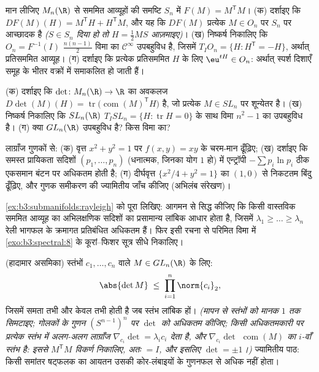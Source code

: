 \begin{exercise}[$\star\star$]\label{exo:b3:submanifolds:5}
मान लीजिए $M_n(\R)$ से सममित आव्यूहों की समष्टि $S_n$ में $F(M) = M^{\mathsf T}M$।
(क) दर्शाइए कि $DF(M)(H) = M^{\mathsf T}H + H^{\mathsf T}M$, और यह कि $DF(M)$ प्रत्येक $M \in O_n$ पर $S_n$ पर
आच्छादक है \emph{($S \in S_n$ दिया हो तो $H = \frac12MS$ आज़माइए)}।
(ख) निष्कर्ष निकालिए कि $O_n = F^{-1}(I)$ $\frac{n(n-1)}2$ विमा का  $\mathcal C^\infty$ उपबहुविध
है, जिसमें $T_IO_n = \{H : H^{\mathsf T} = -H\}$, अर्थात् प्रतिसममित आव्यूह।
(ग) दर्शाइए कि प्रत्येक प्रतिसममित $H$ के लिए $\eu^{tH} \in O_n$: अर्थात्
स्पर्श दिशाएँ समूह के भीतर वक्रों में समाकलित हो जाती हैं।
\end{exercise}

\begin{exercise}[$\star\star$]\label{exo:b3:submanifolds:6}
(क) दर्शाइए कि $\det \colon M_n(\R) \to \R$ का अवकलज $D\det(M)(H) = \operatorname{tr}\bigl(\operatorname{com}(M)
^{\mathsf T}H\bigr)$ है, जो प्रत्येक $M \in SL_n$ पर
शून्येतर है।
(ख) निष्कर्ष निकालिए कि $SL_n(\R)$ $T_ISL_n = \{H : \operatorname{tr}H = 0\}$ के साथ विमा $n^2 - 1$ का उपबहुविध
है।
(ग) क्या $GL_n(\R)$ उपबहुविध है? किस विमा का?
\end{exercise}

\begin{exercise}[$\star\star$]\label{exo:b3:submanifolds:7}
लाग्राँज गुणकों से:
(क) वृत्त $x^2 +
y^2 = 1$ पर $f(x,y) = xy$ के चरम-मान ढूँढ़िए;
(ख) दर्शाइए कि समस्त प्रायिकता सदिशों $(p_1, \dots,
p_n)$ (धनात्मक, जिनका योग
$1$ हो) में एन्ट्रॉपी $-\sum
p_i\ln p_i$ ठीक एकसमान बंटन पर अधिकतम होती है;
(ग) दीर्घवृत्त $\{x^2/4 + y^2 = 1\}$ का $(1, 0)$ से निकटतम बिंदु ढूँढ़िए, और गुणक
समीकरण की ज्यामितीय जाँच कीजिए (अभिलंब संरेखण)।
\end{exercise}

\begin{exercise}[$\star\star\star$]\label{exo:b3:submanifolds:8}
\cref{ex:b3:submanifolds:rayleigh} को पूरा लिखिए: आगमन से सिद्ध कीजिए कि किसी वास्तविक सममित
आव्यूह का अभिलक्षणिक सदिशों का प्रसामान्य लांबिक आधार होता है,
जिसमें $\lambda_1 \geq \dots \geq \lambda_n$ रेली भागफल के क्रमागत प्रतिबंधित अधिकतम हैं। फिर
इसी रचना से परिमित विमा में \cref{exo:b3:spectral:8} के कूरां--फिशर सूत्र सीधे
निकालिए।
\end{exercise}

\begin{exercise}[$\star\star\star$]\label{exo:b3:submanifolds:9}
(हादामार असमिका) स्तंभों $c_1, \dots, c_n$ वाले $M \in GL_n(\R)$ के लिए:
\[
\abs{\det M} \;\leq\; \prod_{i=1}^n\norm{c_i}_2 ,
\]
जिसमें समता तभी और केवल तभी होती है जब स्तंभ लांबिक हों।
\emph{(मापन से स्तंभों को मानक $1$ तक सिमटाइए; गोलकों के 
गुणन $(S^{n-1})^n$ पर $\det$ को अधिकतम कीजिए; किसी अधिकतमकारी पर प्रत्येक
स्तंभ में अलग-अलग लाग्राँज $\nabla_{c_i}\det =
\lambda_ic_i$ देता है, और $\nabla_{c_i}\det$ $\operatorname{com}(M)$ का
$i$-वाँ स्तंभ है: इससे $M^{\mathsf T}M$ विकर्ण निकालिए, अतः $= I$, और
इसलिए $\det = \pm1$।)} ज्यामितीय पाठ: किसी समांतर षट्फलक का आयतन उसकी
कोर-लंबाइयों के गुणनफल से अधिक नहीं होता।
\end{exercise}

